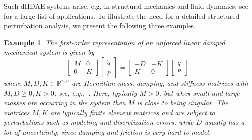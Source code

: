 \documentclass[11pt]{article}
\newtheorem{example}[theorem]{Example}
\begin{document}
Such dHDAE systems arise, e.g. in  structural mechanics and fluid dynamics; see \cite{GudLMS22} for a large list of applications. To illustrate the need for a detailed structured perturbation analysis, we present the following three examples.
%
\begin{example}\label{ex:MDK}{\rm
The first-order representation of an unforced  linear damped mechanical system is given by
%
\begin{equation} \label{eq_brake_dae}
\begin{bmatrix}M &0 \\0 & K \end{bmatrix} \begin{bmatrix} \dot q \\  \dot  p\end{bmatrix} =   \begin{bmatrix}-D  & -K \\ K &0  \end{bmatrix}
\begin{bmatrix} q  \\  p \end{bmatrix},
\end{equation}
%
where $M,D,K\in\mathbb R^{n,n}$ are Hermitian mass, damping, and stiffness matrices with $M,D\geq 0,K>0$; see,
e.g.,~\cite[Chapter 1]{Ves11}. Here, typically $M>0$, but when small and large masses are occurring in the system then $M$ is close to being singular. The matrices $M,K$ are typically finite element matrices and are subject to perturbations such as modeling and discretization errors, while $D$ usually has a lot of uncertainty, since damping and friction is very hard to model.
}
\end{example}
\end{document}
